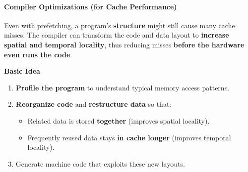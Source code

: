 \paragraph{Compiler Optimizations (for Cache Performance)}\label{paragraph: Compiler Optimizations}

Even with prefetching, a program's \textbf{structure} might still cause many cache misses. The compiler can transform the code and data layout to \textbf{increase spatial and temporal locality}, thus reducing misses \textbf{before the hardware even runs the code}.

\highspace
\begin{flushleft}
    \textcolor{Green3}{ \textbf{Basic Idea}}
\end{flushleft}
\begin{enumerate}
    \item \textbf{Profile the program} to understand typical memory access patterns.
    \item \textbf{Reorganize code} and \textbf{restructure data} so that:
    \begin{itemize}
        \item Related data is stored \textbf{together} (improves spatial locality).
        \item Frequently reused data stays \textbf{in cache longer} (improves temporal locality).
    \end{itemize}
    \item Generate machine code that exploits these new layouts.
\end{enumerate}

